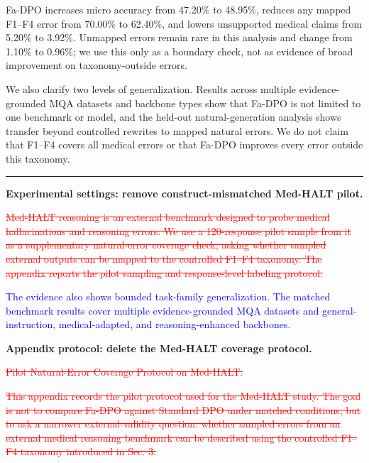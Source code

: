 \documentclass[12pt]{article}
\newcommand{\deleted}[1]{\textcolor{red}{\sout{#1}}}
\newcommand{\added}[1]{\textcolor{blue}{#1}}
\newcommand{\responseheading}[1]{%
    \vspace{0.24cm}
    \par\noindent{\large\bfseries #1}\par
    \vspace{0.03cm}
    \noindent\rule{\linewidth}{0.35pt}\par
    \vspace{0.06cm}
    \noindent\ignorespaces
}
\begin{document}
Fa-DPO increases micro accuracy from 47.20\% to 48.95\%, reduces any mapped F1--F4 error from 70.00\% to 62.40\%, and lowers unsupported medical claims from 5.20\% to 3.92\%. Unmapped errors remain rare in this analysis and change from 1.10\% to 0.96\%; we use this only as a boundary check, not as evidence of broad improvement on taxonomy-outside errors.

We also clarify two levels of generalization. Results across multiple evidence-grounded MQA datasets and backbone types show that Fa-DPO is not limited to one benchmark or model, and the held-out natural-generation analysis shows transfer beyond controlled rewrites to mapped natural errors. We do not claim that F1--F4 covers all medical errors or that Fa-DPO improves every error outside this taxonomy.


\responseheading{Revision Details}
\textbf{Experimental settings: remove construct-mismatched Med-HALT pilot.}
\begin{displayquote}
\deleted{Med-HALT reasoning is an external benchmark designed to probe medical hallucinations and reasoning errors. We use a 120-response pilot sample from it as a supplementary natural-error coverage check, asking whether sampled external outputs can be mapped to the controlled F1--F4 taxonomy. The appendix reports the pilot sampling and response-level labeling protocol.}

\added{The evidence also shows bounded task-family generalization. The matched benchmark results cover multiple evidence-grounded MQA datasets and general-instruction, medical-adapted, and reasoning-enhanced backbones.}
\end{displayquote}

\textbf{Appendix protocol: delete the Med-HALT coverage protocol.}
\begin{displayquote}
\deleted{Pilot Natural-Error Coverage Protocol on Med-HALT.}

\deleted{This appendix records the pilot protocol used for the Med-HALT study. The goal is not to compare Fa-DPO against Standard DPO under matched conditions, but to ask a narrower external-validity question: whether sampled errors from an external medical reasoning benchmark can be described using the controlled F1--F4 taxonomy introduced in Sec. 3.}
\end{displayquote}
\end{document}
